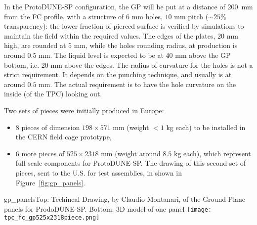 
In the ProtoDUNE-SP configuration, the GP will be put at a distance of 200~mm from the FC profile, with a structure of $6$ mm holes, $10$ mm pitch ($\sim 25\%$ transparency): the lower fraction of pierced surface is verified by simulations to maintain the field within the required values. The edges of the plates, $20$ mm high, are rounded at $5$ mm, while the holes rounding radius, at production is around $0.5$ mm. The liquid level is expected to be at 40 mm above the GP bottom, i.e. 20 mm above the edges. The radius of curvature for the holes is not a strict requirement. It depends on the punching technique, and usually is at around $0.5$ mm. The actual requirement is to have the hole curvature on the inside (of the TPC) looking out.

Two sets of pieces  were initially produced in Europe:
\begin{itemize}
\item 8 pieces of dimension $198 \times 571$ mm (weight $< 1$ kg each) to be installed in the CERN field cage prototype,
\item 6 more pieces of  $525 \times 2318$ mm (weight around $8.5$ kg each), which represent full scale components for ProtoDUNE-SP. The drawing of this second set of pieces, sent to the U.S. for test assemblies, in shown in Figure~\ref{fig:gp_panels}.
\end{itemize}

\begin{cdrfigure}[ProtoDUNE GP]{gp_panels}{Top: Techincal Drawing, by Claudio Montanari, of the Ground Plane panels for ProdoDUNE-SP. Bottom: 3D model of one panel}
\texttt{[image: tpc\_fc\_gp525x2318piece.png]}
\end{cdrfigure}

